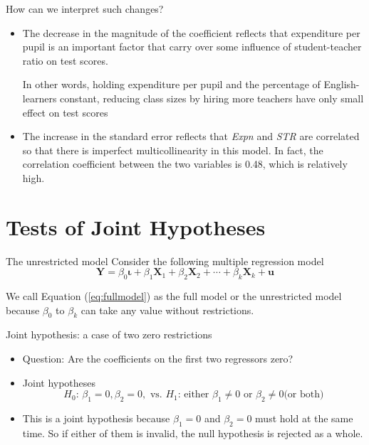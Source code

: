 \documentclass[presentation,10pt]{beamer}
\begin{document}
\begin{frame}[label={sec:org935e628}]{How can we interpret such changes?}
\begin{itemize}
\item The decrease in the magnitude of the coefficient reflects that
expenditure per pupil is an important factor that carry over some
influence of student-teacher ratio on test scores.
\vspace{0.2cm}

In other words, holding expenditure per pupil and the percentage of
English-learners constant, reducing class sizes by hiring more
teachers have only small effect on test scores
\vspace{0.2cm}

\item The increase in the standard error reflects that \emph{Expn} and \emph{STR}
are correlated so that there is imperfect multicollinearity in this
model. In fact, the correlation coefficient between the two
variables is 0.48, which is relatively high.
\end{itemize}
\end{frame}


\section{Tests of Joint Hypotheses}
\label{sec:org062799c}
\setcounter{tocdepth}{1}
\tableofcontents[currentsection]
\begin{frame}[label={sec:orgf19ed70}]{The unrestricted model}
Consider the following multiple regression model
\begin{equation}
\label{eq:fullmodel}
\mathbf{Y} = \beta_0 \boldsymbol{\iota} + \beta_1 \mathbf{X}_1 + \beta_2 \mathbf{X}_2 + \cdots + \beta_k \mathbf{X}_k + \mathbf{u}
\end{equation}

We call Equation (\ref{eq:fullmodel}) as the full model or \alert{the
unrestricted model} because \(\beta_0\) to \(\beta_k\) can take any value
without restrictions.
\end{frame}

\begin{frame}[label={sec:org4b3c21a}]{Joint hypothesis: a case of two zero restrictions}
\begin{itemize}
\item Question: Are the coefficients on the first two regressors zero?

\item Joint hypotheses
\[ H_0:\, \beta_1 = 0, \beta_2 = 0, \text{ vs. }
  H_1:\, \text{either } \beta_1 \neq 0 \text{ or } \beta_2 \neq 0 \text{
  (or both)} \]

\item This is a joint hypothesis because \(\beta_1=0\) and \(\beta_2=0\) must
hold at the same time. So if either of them is invalid, the null
hypothesis is rejected as a whole.
\end{itemize}
\end{frame}
\end{document}
